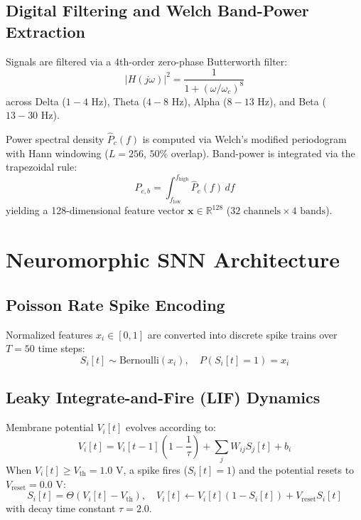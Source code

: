 \documentclass[journal]{IEEEtran}
\begin{document}
\subsection{Digital Filtering and Welch Band-Power Extraction}
Signals are filtered via a 4th-order zero-phase Butterworth filter:
\begin{equation}
|H(j\omega)|^2 = \frac{1}{1 + (\omega / \omega_c)^8}
\end{equation}
across Delta ($1-4\text{ Hz}$), Theta ($4-8\text{ Hz}$), Alpha ($8-13\text{ Hz}$), and Beta ($13-30\text{ Hz}$).

Power spectral density $\hat{P}_c(f)$ is computed via Welch's modified periodogram with Hann windowing ($L=256$, $50\%$ overlap). Band-power is integrated via the trapezoidal rule:
\begin{equation}
P_{c, b} = \int_{f_{\text{low}}}^{f_{\text{high}}} \hat{P}_c(f) \, df
\end{equation}
yielding a 128-dimensional feature vector $\mathbf{x} \in \mathbb{R}^{128}$ ($32\text{ channels} \times 4\text{ bands}$).

\section{Neuromorphic SNN Architecture}
\subsection{Poisson Rate Spike Encoding}
Normalized features $x_i \in [0, 1]$ are converted into discrete spike trains over $T = 50$ time steps:
\begin{equation}
S_i[t] \sim \text{Bernoulli}(x_i), \quad P(S_i[t] = 1) = x_i
\end{equation}

\subsection{Leaky Integrate-and-Fire (LIF) Dynamics}
Membrane potential $V_i[t]$ evolves according to:
\begin{equation}
V_i[t] = V_i[t-1]\left(1 - \frac{1}{\tau}\right) + \sum_j W_{ij} S_j[t] + b_i
\end{equation}
When $V_i[t] \ge V_{\text{th}} = 1.0\text{ V}$, a spike fires ($S_i[t]=1$) and the potential resets to $V_{\text{reset}} = 0.0\text{ V}$:
\begin{equation}
S_i[t] = \Theta(V_i[t] - V_{\text{th}}), \quad V_i[t] \leftarrow V_i[t](1 - S_i[t]) + V_{\text{reset}} S_i[t]
\end{equation}
with decay time constant $\tau = 2.0$.
\end{document}
